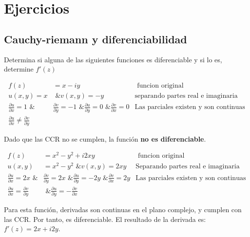 \section{Ejercicios}

\subsection{Cauchy-riemann y diferenciabilidad}

Determina si alguna de las siguientes funciones es diferenciable y si lo es, determine \( f'(z) \)

\begin{align}
    f(z) &= x - iy & \text{ funcion original } \nonumber \\
    u(x, y) = x &\text{ \& } v(x, y) = -y
        & \text{separando partes real e imaginaria} \nonumber \\
    \frac{\partial u}{\partial x}=1 \text{ \& } 
        &\frac{\partial v}{\partial y}=-1 \text{ \& }
        \frac{\partial u}{\partial y}=0 \text{ \& }
        \frac{\partial v}{\partial x}=0
        & \text{Las parciales existen y son continuas}
        \nonumber \\
    \frac{\partial u}{\partial x}\neq\frac{\partial v}{\partial y}
        & & \nonumber
\end{align}

Dado que las CCR no se cumplen, la función \textbf{no es diferenciable}.

\begin{align}
    f(z) &= x^2 - y^2 + i2xy & \text{ funcion original } \nonumber \\
    u(x, y) &= x^2 - y^2 \text{  \&  } v(x, y) = 2xy
        & \text{Separando partes real e imaginaria} \nonumber \\
    \frac{\partial u}{\partial x}=2x \text{ \& } 
        &\frac{\partial v}{\partial y}=2x \text{ \& }
        \frac{\partial u}{\partial y}=-2y \text{ \& }
        \frac{\partial v}{\partial x}=2y
        & \text{Las parciales existen y son continuas}
        \nonumber \\
    \frac{\partial u}{\partial x}=\frac{\partial v}{\partial y}
        & \text{ \& } \frac{\partial u}{\partial y} = -\frac{\partial v}{\partial x} & \nonumber
\end{align}

Para esta función, derivadas son continuas en el plano complejo, y cumplen con las CCR. Por tanto, es diferenciable. El resultado de la derivada es: \( f'(z) = 2x + i2y \).